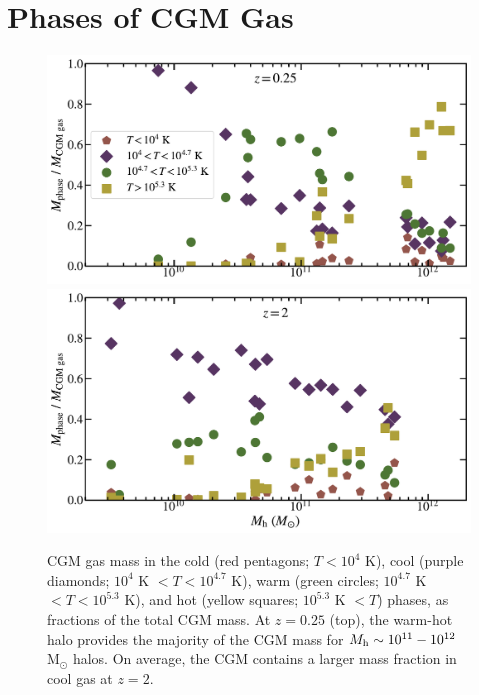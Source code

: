 \documentclass[fleqn,usenatbib]{mnras}
\begin{document}







\appendix

\section{Phases of CGM Gas}
\label{sec:mass_by_phase}

\begin{figure}
\includegraphics[width=\columnwidth]{figures/phase_cgm_mass_budget_snum465.pdf}
\includegraphics[width=\columnwidth]{figures/phase_cgm_mass_budget_snum172.pdf}
\caption{
CGM gas mass in the cold (red pentagons; $T < 10^4$ K), cool (purple diamonds; $10^4$ K $< T < 10^{4.7}$ K), warm (green circles; $10^{4.7}$ K $< T < 10^{5.3}$ K), and hot (yellow squares; $10^{5.3}$ K $< T$) phases, as fractions of the total CGM mass.
At $z=0.25$ (top), the warm-hot halo provides the majority of the CGM mass for $M_{\rm h}\sim 10^{11}-10^{12}$ M$_{\odot}$ halos. 
On average, the CGM contains a larger mass fraction in cool gas at $z=2$. 
}
\label{fig:phase_cgm_mass_budget}
\end{figure}
\end{document}
